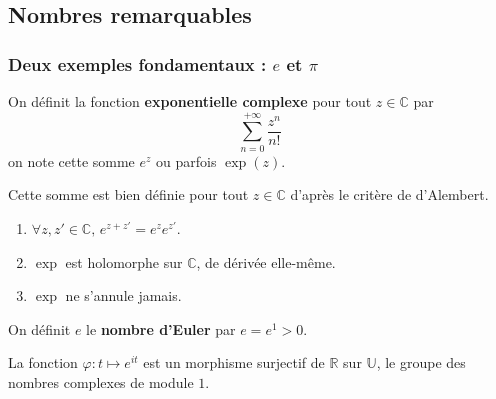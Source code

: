 




  \subsection{Nombres remarquables}

  \subsubsection{Deux exemples fondamentaux : \texorpdfstring{$e$}{e} et \texorpdfstring{$\pi$}{π}}


  \begin{definition}
    On définit la fonction \textbf{exponentielle complexe} pour tout $z \in \mathbb{C}$ par
    \[ \sum_{n=0}^{+\infty} \frac{z^n}{n!} \]
    on note cette somme $e^z$ ou parfois $\exp(z)$.
  \end{definition}

  \begin{remark}
    Cette somme est bien définie pour tout $z \in \mathbb{C}$ d'après le critère de d'Alembert.
  \end{remark}

  \begin{proposition}
    \begin{enumerate}[label={\bfseries(\roman*)}]
      \item $\forall z, z' \in \mathbb{C}, \, e^{z+z'} = e^z e^{z'}$.
      \item $\exp$ est holomorphe sur $\mathbb{C}$, de dérivée elle-même.
      \item $\exp$ ne s'annule jamais.
    \end{enumerate}
  \end{proposition}


  \begin{definition}
    On définit $e$ le \textbf{nombre d'Euler} par $e = e^1 > 0$.
  \end{definition}


  \begin{proposition}
    La fonction $\varphi : t \mapsto e^{it}$ est un morphisme surjectif de $\mathbb{R}$ sur $\mathbb{U}$, le groupe des nombres complexes de module $1$.
  \end{proposition}

